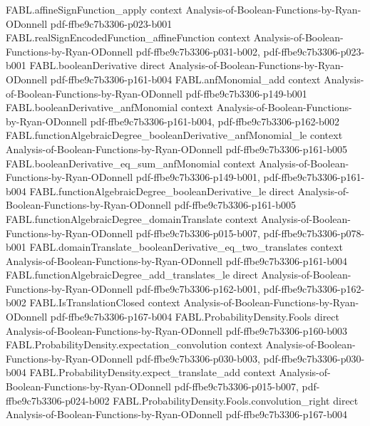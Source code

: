 \begin{theorem}
\proofstep
  {FABL.affineSignFunction_apply}
  {context}
  {Analysis-of-Boolean-Functions-by-Ryan-ODonnell}
  {pdf-ffbe9c7b3306-p023-b001}
\proofstep
  {FABL.realSignEncodedFunction_affineFunction}
  {context}
  {Analysis-of-Boolean-Functions-by-Ryan-ODonnell}
  {pdf-ffbe9c7b3306-p031-b002,
    pdf-ffbe9c7b3306-p023-b001}
\proofstep
  {FABL.booleanDerivative}
  {direct}
  {Analysis-of-Boolean-Functions-by-Ryan-ODonnell}
  {pdf-ffbe9c7b3306-p161-b004}
\proofstep
  {FABL.anfMonomial_add}
  {context}
  {Analysis-of-Boolean-Functions-by-Ryan-ODonnell}
  {pdf-ffbe9c7b3306-p149-b001}
\proofstep
  {FABL.booleanDerivative_anfMonomial}
  {context}
  {Analysis-of-Boolean-Functions-by-Ryan-ODonnell}
  {pdf-ffbe9c7b3306-p161-b004,
    pdf-ffbe9c7b3306-p162-b002}
\proofstep
  {FABL.functionAlgebraicDegree_booleanDerivative_anfMonomial_le}
  {context}
  {Analysis-of-Boolean-Functions-by-Ryan-ODonnell}
  {pdf-ffbe9c7b3306-p161-b005}
\proofstep
  {FABL.booleanDerivative_eq_sum_anfMonomial}
  {context}
  {Analysis-of-Boolean-Functions-by-Ryan-ODonnell}
  {pdf-ffbe9c7b3306-p149-b001,
    pdf-ffbe9c7b3306-p161-b004}
\proofstep
  {FABL.functionAlgebraicDegree_booleanDerivative_le}
  {direct}
  {Analysis-of-Boolean-Functions-by-Ryan-ODonnell}
  {pdf-ffbe9c7b3306-p161-b005}
\proofstep
  {FABL.functionAlgebraicDegree_domainTranslate}
  {context}
  {Analysis-of-Boolean-Functions-by-Ryan-ODonnell}
  {pdf-ffbe9c7b3306-p015-b007,
    pdf-ffbe9c7b3306-p078-b001}
\proofstep
  {FABL.domainTranslate_booleanDerivative_eq_two_translates}
  {context}
  {Analysis-of-Boolean-Functions-by-Ryan-ODonnell}
  {pdf-ffbe9c7b3306-p161-b004}
\proofstep
  {FABL.functionAlgebraicDegree_add_translates_le}
  {direct}
  {Analysis-of-Boolean-Functions-by-Ryan-ODonnell}
  {pdf-ffbe9c7b3306-p162-b001,
    pdf-ffbe9c7b3306-p162-b002}
\proofstep
  {FABL.IsTranslationClosed}
  {context}
  {Analysis-of-Boolean-Functions-by-Ryan-ODonnell}
  {pdf-ffbe9c7b3306-p167-b004}
\proofstep
  {FABL.ProbabilityDensity.Fools}
  {direct}
  {Analysis-of-Boolean-Functions-by-Ryan-ODonnell}
  {pdf-ffbe9c7b3306-p160-b003}
\proofstep
  {FABL.ProbabilityDensity.expectation_convolution}
  {context}
  {Analysis-of-Boolean-Functions-by-Ryan-ODonnell}
  {pdf-ffbe9c7b3306-p030-b003,
    pdf-ffbe9c7b3306-p030-b004}
\proofstep
  {FABL.ProbabilityDensity.expect_translate_add}
  {context}
  {Analysis-of-Boolean-Functions-by-Ryan-ODonnell}
  {pdf-ffbe9c7b3306-p015-b007,
    pdf-ffbe9c7b3306-p024-b002}
\proofstep
  {FABL.ProbabilityDensity.Fools.convolution_right}
  {direct}
  {Analysis-of-Boolean-Functions-by-Ryan-ODonnell}
  {pdf-ffbe9c7b3306-p167-b004}

\end{theorem}
